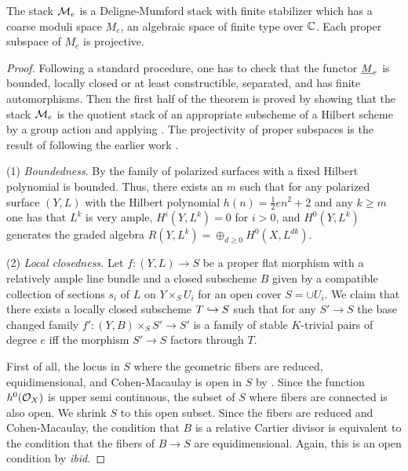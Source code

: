 \documentclass[table,x11names]{amsart}
\newcommand\cme{\cM_e}
\newcommand\ume{\uM_e}
\begin{document}
\begin{theorem}\label{thm:slc-moduli}
  The stack $\cme$ is a Deligne-Mumford stack with finite
  stabilizer
   which has a coarse moduli space $M_e$, an algebraic
  space of finite type over ${\mathbb C}$. Each proper subspace of $M_e$
  is projective.
\end{theorem}
\begin{proof}
  Following a standard procedure, one has to check that the functor
  $\ume$ is bounded, locally closed or at least constructible,
  separated, and has finite automorphisms. Then the first half of the
  theorem is proved by showing that the stack $\cme$ is the quotient
  stack of an appropriate subscheme of a Hilbert scheme by a group
  action and applying \cite{keel1997quotients-by-groupoids}. The
  projectivity of proper subspaces is the result of
  \cite{kovacs2017projectivity, fujino2018semipositivity-theorems} 
  following the earlier work \cite{kollar1990projectivity-of-complete}.

  (1) \emph{Boundedness}. By
  \cite[Thm. 2.1.2]{kollar1985toward-moduli} the family of polarized
  surfaces with a fixed Hilbert polynomial is bounded. Thus, there
  exists an $m$ such that for any polarized surface $(Y,L)$ with the
  Hilbert polynomial $h(n)=\frac12 en^2+2$ and any $k\ge m$ one has
  that $L^k$ is very ample, $H^i(Y,L^k)=0$ for $i>0$, and $H^0(Y,L^k)$
  generates the graded algebra
  $R(Y,L^k)=\oplus_{d\ge0} H^0(X, L^{dk})$.

  (2) \emph{Local closedness.} Let $f\colon (Y, L)\to S$ be a
  proper flat morphism with a relatively ample line bundle and a
  closed subscheme $B$ given by a compatible collection of sections
  $s_i$ of $L$ on $Y\times_S U_i$ for an open cover $S=\cup U_i$.
  We claim that there exists a locally closed subscheme $T\hookrightarrow S$ such
  that for any $S'\to S$ the base changed family
  $f'\colon (Y,B)\times_S S' \to S'$ is a family of stable
  $K$-trivial pairs of degree $e$ iff the morphism $S'\to S$ factors
  through $T$.

  First of all, the locus in $S$ where the geometric fibers are
  reduced, equidimensional, and Cohen-Macaulay is open in $S$ by
  \cite[IV$_3$, 12.2]{grothendieck1965elements-de-geometrie43}.
  Since the function $h^0({\mathcal O}_X)$ is upper semi continuous, the subset
  of $S$ where fibers are connected is also open. We
  shrink $S$ to this open subset. Since the fibers are reduced and
  Cohen-Macaulay, the condition that $B$ is a relative Cartier
  divisor is equivalent to the condition that the fibers of $B\to S$
  are equidimensional. Again, this is an open condition by
  \emph{ibid.}


\end{proof}
\end{document}
